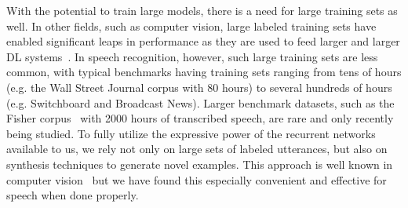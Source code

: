 With the potential to train large models, there is a need for large training
sets as well. In other fields, such as computer vision, large labeled training
sets have enabled significant leaps in performance as they are used to feed
larger and larger DL systems~\cite{szegedy2105, krizhevsky2012imagenet}. In
speech recognition, however, such large training sets are less common, with
typical benchmarks having training sets ranging from tens of hours (e.g. the
Wall Street Journal corpus with 80 hours) to several hundreds of hours (e.g.
Switchboard and Broadcast News). Larger benchmark datasets, such as the Fisher
corpus~\cite{cieri2004fisher} with 2000 hours of transcribed speech, are rare
and only recently being studied. To fully utilize the expressive power of the
recurrent networks available to us, we rely not only on large sets of labeled
utterances, but also on synthesis techniques to generate novel examples. This
approach is well known in computer vision~\cite{sapp2008, lecun2004,
coates2011} but we have found this especially convenient and effective for
speech when done properly.
